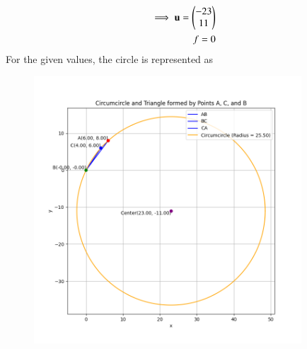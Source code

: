 \documentclass[journal]{IEEEtran}
\begin{document}
\begin{enumerate}
\begin{align}
    \implies \mathbf{u} = \begin{pmatrix}-23\\11\end{pmatrix}\\f = 0
\end{align}
For the given values, the circle is represented as
\begin{figure}[h!]
    \centering
    \includegraphics[width=10cm]{figs/figure.png}
    \caption{}
    \label{fig:enter-label}
\end{figure}
\end{enumerate}
\end{document}

